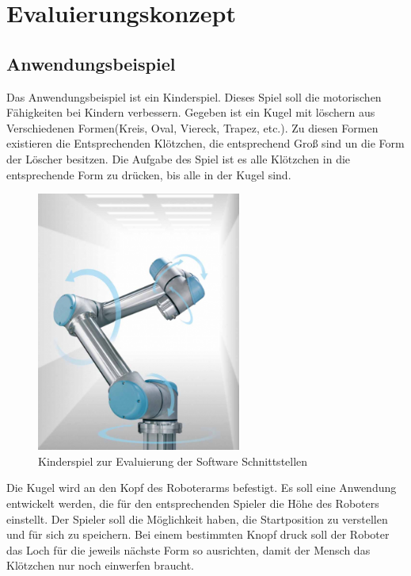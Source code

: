 \chapter{Evaluierungskonzept}
\label{konzept_kon}

\section{Anwendungsbeispiel}
\label{sec:anwendung_kon}

Das Anwendungsbeispiel ist ein Kinderspiel. Dieses Spiel soll die motorischen Fähigkeiten bei Kindern verbessern.
Gegeben ist ein Kugel mit löschern aus Verschiedenen Formen(Kreis, Oval, Viereck, Trapez, etc.). Zu diesen Formen existieren die Entsprechenden Klötzchen, die entsprechend Groß sind un die Form der Löscher besitzen. Die Aufgabe des Spiel ist es alle Klötzchen in die entsprechende Form zu drücken, bis alle in der Kugel sind.

\begin{figure}[H]
  \centering
    \includegraphics[width=0.6\textwidth]{pic/ur5_robot.png}
      \caption[Kinder Geschicklichkeitsspiel]{Kinderspiel zur Evaluierung der Software Schnittstellen}
      \label{fig:kinderspiel}
\end{figure}

Die Kugel wird an den Kopf des Roboterarms befestigt. Es soll eine Anwendung entwickelt werden, die für den entsprechenden Spieler die Höhe des Roboters einstellt. Der Spieler soll die Möglichkeit haben, die Startposition zu verstellen und für sich zu speichern. Bei einem bestimmten Knopf druck soll der Roboter das Loch für die jeweils nächste Form so ausrichten, damit der Mensch das Klötzchen nur noch einwerfen braucht.

